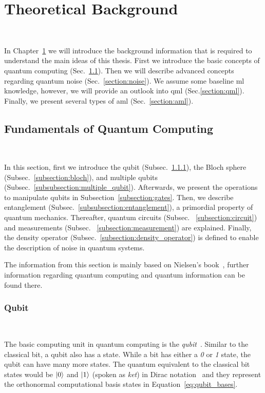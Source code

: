 \chapter{Theoretical Background}\label{chapter:background} \

In Chapter~\ref{chapter:background} we will introduce the
background information that is required to understand
the main ideas of this thesis. First we introduce
the basic concepts of quantum computing (Sec.~\ref{section:qc}). Then we will
describe advanced concepts regarding quantum noise (Sec.~\ref{section:noise}). We
assume some baseline \ac{ml} knowledge, however, we
will provide an outlook into \ac{qml} (Sec.\ref{section:qml}). Finally, we
present several types of \ac{aml} (Sec.~\ref{section:aml}). \

\section{Fundamentals of Quantum Computing}\label{section:qc} \

In this section, first we introduce the qubit (Subsec.~\ref{subsection:qubit}),
the Bloch sphere (Subsec.~\ref{subsection:bloch}), and
multiple qubits (Subsec.~\ref{subsubsection:multiple_qubit}).
Afterwards, we present the operations to manipulate qubits in 
Subsection~\ref{subsection:gates}. Then, we describe entanglement
(Subsec.~\ref{subsubsection:entanglement}), a primordial
property of quantum mechanics. Thereafter, quantum circuits (Subsec.
~\ref{subsection:circuit}) and measurements (Subsec.
~\ref{subsection:measurement}) are explained. Finally, the
density operator (Subsec.~\ref{subsection:density_operator})
is defined to enable the description of noise in quantum systems. \

The information from this section is mainly based on Nielsen's
book~\cite{nielsen_quantum_2010}, further information regarding
quantum computing and quantum information can be found there. \

\subsection{Qubit}\label{subsection:qubit} \

The basic computing unit in quantum computing is the
\textit{qubit}~\cite{schumacher_quantum_1995}. Similar to the classical
bit, a qubit also has a state. While a bit has either a
\textit{0} or \textit{1} state, the qubit can have
many more states. The quantum equivalent to the classical
bit states would be \(\ket{0}\) and \(\ket{1}\) (spoken as \textit{ket}) in Dirac
notation~\cite{dirac_new_1939} and they represent the orthonormal computational
basis states in Equation~\ref{eq:qubit_bases}. \

